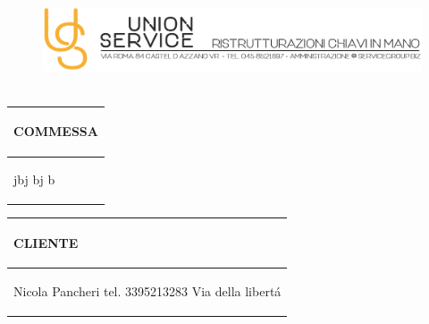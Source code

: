 \documentclass[a4paper]{article}
\begin{document}
                        \begin{figure}[!t]
                        \includegraphics[width=15.8cm, height=3cm]{intestazioneAlta2.jpg}
                        \end{figure}

                        \noindent\begin{tabular}{| L{72.2mm} |}
                            \hline
                            \vspace{2.5mm}
                            \begin{spacing}{0}
                            \textbf{COMMESSA}
                            \end{spacing}\\
                            \hline
                            \vspace{4mm}
                            \begin{spacing}{1.2}

                        jbj \newline bj \newline b
                          \end{spacing}\\
                            \hline
                          \end{tabular}
                          \quad
                          \begin{tabular}{ | R{72.2mm} | }
                            \hline
                            \vspace{2.5mm}
                            \begin{spacing}{0}
                            \textbf{CLIENTE}
                            \end{spacing}\\
                            \hline
                            \vspace{4mm}
                            \begin{spacing}{1.2}

                       Nicola Pancheri \newline tel. 3395213283 \newline Via della libert\'a
                          \end{spacing}\\
                            \hline
                          \end{tabular}
\end{document}
